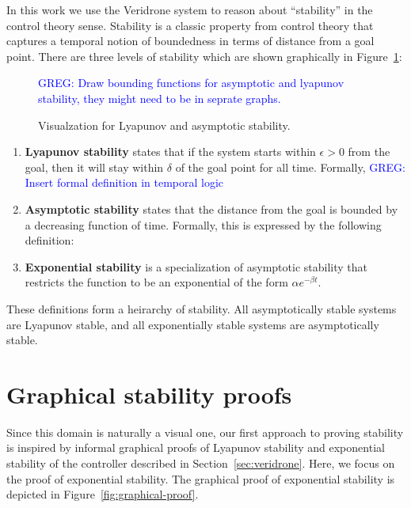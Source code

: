 \documentclass[preprint,nocopyrightspace]{sigplanconf}
\newcommand{\greg}[1]{\textcolor{blue}{\textsc{GREG}: #1}}
\begin{document}
In this work we use the Veridrone system to reason about ``stability'' in the control theory sense.
Stability is a classic property from control theory that captures a temporal notion of boundedness in terms of distance from a goal point.
There are three levels of stability which are shown graphically in Figure~\ref{fig:stability}:


\begin{figure}[!h]

  \greg{Draw bounding functions for asymptotic and lyapunov stability, they might need to be in seprate graphs.}
  \scalebox{0.6}{}
  \scalebox{0.6}{}

  \caption{Visualzation for Lyapunov and asymptotic stability.}
  \label{fig:stability}
\end{figure}


\begin{enumerate}
\item \textbf{Lyapunov stability} states that if the system starts within $\epsilon > 0$ from the goal, then it will stay within $\delta$ of the goal point for all time.
Formally,
\greg{Insert formal definition in temporal logic}

\item \textbf{Asymptotic stability} states that the distance from the goal is bounded by a decreasing function of time.
Formally, this is expressed by the following definition:

\item \textbf{Exponential stability} is a specialization of asymptotic stability that restricts the function to be an exponential of the form $\alpha e^{-\beta t}$.

\end{enumerate}

These definitions form a heirarchy of stability.
All asymptotically stable systems are Lyapunov stable, and all exponentially stable systems are asymptotically stable.

\section{Graphical stability proofs}
\label{sec:graphical}
Since this domain is naturally a visual one, our first approach to proving stability is inspired by informal graphical proofs of Lyapunov stability and exponential stability of the controller described in Section~\ref{sec:veridrone}.
Here, we focus on the proof of exponential stability.
The graphical proof of exponential stability is depicted in Figure~\ref{fig:graphical-proof}.
\end{document}
